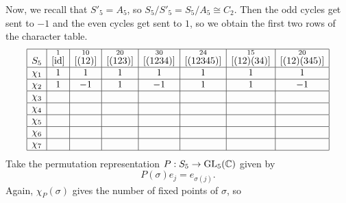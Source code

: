 \begin{exmp}{}
    \newpage
    Now, we recall that $S'_5 = A_5$, so $S_5/S'_5 = S_5/A_5 \cong C_2$. 
    Then the odd cycles get sent to $-1$ and the even cycles get sent to 
    $1$, so we obtain the first two rows of the character table. 
    \begin{align*}
        \begin{array}{|c|c|c|c|c|c|c|c|}
            \hline
            S_5    & \overset{1}{[\operatorname{id}]} & \overset{10}{[(12)]} & \overset{20}{[(123)]} & \overset{30}{[(1234)]} & \overset{24}{[(12345)]} & \overset{15}{[(12)(34)]} & \overset{20}{[(12)(345)]} \\ \hline
            \chi_1 & 1                  & 1                    & 1                     & 1                      & 1                       & 1                        & 1                         \\ \hline
            \chi_2 & 1                  & -1                   & 1                     & -1                     & 1                       & 1                        & -1                        \\ \hline
            \chi_3 &                    &                      &                       &                        &                         &                          &                           \\ \hline
            \chi_4 &                    &                      &                       &                        &                         &                          &                           \\ \hline
            \chi_5 &                    &                      &                       &                        &                         &                          &                           \\ \hline
            \chi_6 &                    &                      &                       &                        &                         &                          &                           \\ \hline
            \chi_7 &                    &                      &                       &                        &                         &                          &                           \\ \hline 
        \end{array} 
    \end{align*}
    Take the permutation representation $P : S_5 \to \operatorname{GL}_5(\mathbb{C})$ given by 
    \[ P(\sigma)e_j = e_{\sigma(j)}. \] 
    Again, $\chi_P(\sigma)$ gives the number of fixed points of $\sigma$, so 

\end{exmp}
